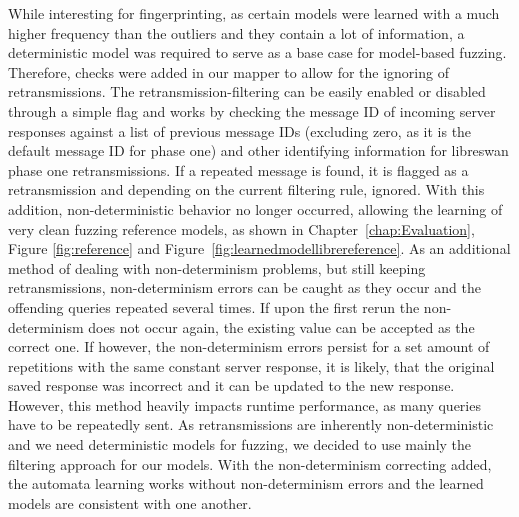 While interesting for fingerprinting, as certain models were learned with a much higher frequency than the outliers and they contain a lot of information, a deterministic model was required to serve as a base case for model-based fuzzing. Therefore, checks were added in our mapper to allow for the ignoring of retransmissions. The retransmission-filtering can be easily enabled or disabled through a simple flag and works by checking the message ID of incoming server responses against a list of previous message IDs (excluding zero, as it is the default message ID for phase one) and other identifying information for libreswan phase one retransmissions. If a repeated message is found, it is flagged as a retransmission and depending on the current filtering rule, ignored. With this addition, non-deterministic behavior no longer occurred, allowing the learning of very clean fuzzing reference models, as shown in Chapter~\ref{chap:Evaluation}, Figure \ref{fig:reference} and Figure~\ref{fig:learnedmodellibrereference}. As an additional method of dealing with non-determinism problems, but still keeping retransmissions, non-determinism errors can be caught as they occur and the offending queries repeated several times. If upon the first rerun the non-determinism does not occur again, the existing value can be accepted as the correct one. If however, the non-determinism errors persist for a set amount of repetitions with the same constant server response, it is likely, that the original saved response was incorrect and it can be updated to the new response. However, this method heavily impacts runtime performance, as many queries have to be repeatedly sent. As retransmissions are inherently non-deterministic and we need deterministic models for fuzzing, we decided to use mainly the filtering approach for our models. With the non-determinism correcting added, the automata learning works without non-determinism errors and the learned models are consistent with one another.
